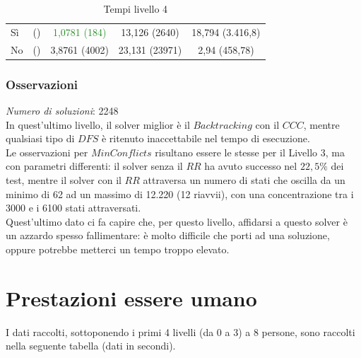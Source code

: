  \begin{table}[h] 
	\begin{tabular}{|l||*{4}{c|}}\hline 
		\backslashbox{Miglioria}{Solver} 
		&\makebox{DFS}&\makebox{Backtracking}&\makebox{Recursive Backtracking}	&\makebox{MinConflicts}\\ \hline 
		Sì& ()&\textcolor{ForestGreen}{1,0781 (184)}&13,126 (2640)&18,794 (3.416,8) \\ \hline 
		No& ()&3,8761 (4002)&23,131 (23971)&2,94 (458,78)  \\ \hline 
	\end{tabular} 
	\caption{Tempi livello 4}
\end{table}

\subsubsection{Osservazioni}

\textit{Numero di soluzioni}: 2248\\

In quest'ultimo livello, il solver miglior è il $Backtracking$ con il $CCC$, mentre qualsiasi tipo di $DFS$ è ritenuto inaccettabile nel tempo di esecuzione.\\

Le osservazioni per $MinConflicts$ risultano essere le stesse per il Livello 3, ma con parametri differenti: il solver senza il $RR$ ha avuto successo nel $22,5\%$ dei test, mentre il solver con il $RR$ attraversa un numero di stati che oscilla da un minimo di 62 ad un massimo di 12.220 (12 riavvii), con una concentrazione tra i 3000 e i 6100 stati attraversati.\\

Quest'ultimo dato ci fa capire che, per questo livello, affidarsi a questo solver è un azzardo spesso fallimentare: è molto difficile che porti ad una soluzione, oppure potrebbe metterci un tempo troppo elevato. 

\section{Prestazioni essere umano}
\label{human}
I dati raccolti, sottoponendo i primi 4 livelli (da 0 a 3) a 8 persone, sono raccolti nella seguente tabella (dati in secondi).


